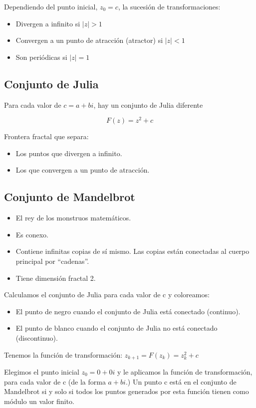 Dependiendo del punto inicial, $z_0 = c$, la sucesión de transformaciones:
\begin{itemize}
	\item Divergen a infinito si $|z|>1$
	\item Convergen a un punto de atracción (atractor) si $|z|<1$
	\item Son periódicas si $|z|=1$
\end{itemize}

\subsection{Conjunto de Julia}
Para cada valor de $c = a + bi$, hay un conjunto de Julia diferente

$$F(z)=z^2+c$$

Frontera fractal que separa:
\begin{itemize}
	\item Los puntos que divergen a infinito.
	\item Los que convergen a un punto de atracción.
\end{itemize}

\subsection{Conjunto de Mandelbrot}
\begin{itemize}
	\item El rey de los monstruos matemáticos.
	\item Es conexo.
	\item Contiene infinitas copias de sí mismo. Las copias están conectadas al cuerpo principal por “cadenas”.
	\item Tiene dimensión fractal 2.
\end{itemize}

Calculamos el conjunto de Julia para cada valor de c y coloreamos:
\begin{itemize}
	\item El punto de negro cuando el conjunto de Julia está conectado (continuo).
	\item El punto de blanco cuando el conjunto de Julia no está conectado (discontinuo).
\end{itemize}

Tenemos la función de transformación: $z_{k+1}=F(z_k)=z^2_k + c$

Elegimos el punto inicial $z_0 = 0 + 0i$ y le aplicamos la función de transformación, para cada valor de c (de la forma $a + bi$.) Un punto c está en el conjunto de Mandelbrot si y solo si todos los puntos generados por esta función tienen como módulo un valor finito.

